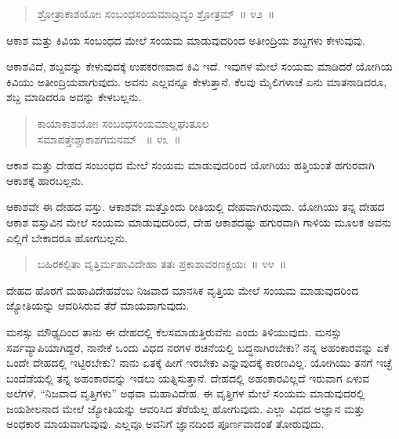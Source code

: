 \vspace{-0.3cm}

\begin{verse}
ಶ್ರೋತ್ರಾಕಾಶಯೋಃ ಸಂಬಂಧಸಂಯಮಾದ್ದಿವ್ಯಂ ಶ್ರೋತ್ರಮ್​~॥ ೪೨~॥
\end{verse}

\vspace{-0.3cm}

ಆಕಾಶ ಮತ್ತು ಕಿವಿಯ ಸಂಬಂಧದ ಮೇಲೆ ಸಂಯಮ ಮಾಡುವುದರಿಂದ ಅತೀಂದ್ರಿಯ ಶಬ್ದಗಳು ಕೇಳುವುವು. 

ಆಕಾಶವಿದೆ, ಶಬ್ದವನ್ನು ಕೇಳುವುದಕ್ಕೆ ಉಪಕರಣವಾದ ಕಿವಿ ಇದೆ. ಇವುಗಳ ಮೇಲೆ ಸಂಯಮ ಮಾಡಿದರೆ ಯೋಗಿಯ ಕಿವಿಯು ಅತೀಂದ್ರಿಯವಾಗುವುದು. ಅವನು ಎಲ್ಲವನ್ನೂ ಕೇಳುತ್ತಾನೆ. ಕೆಲವು ಮೈಲಿಗಳಾಚೆ ಏನು ಮಾತನಾಡಿದರೂ, ಶಬ್ದ ಮಾಡಿದರೂ ಅದನ್ನು ಕೇಳಬಲ್ಲನು. 

\vspace{-0.3cm}

\begin{verse}
ಕಾಯಾಕಾಶಯೋಃ ಸಂಬಂಧಸಂಯಮಾಲ್ಲಘುತೂಲ\\ ಸಮಾಪತ್ತೇಶ್ಚಾಕಾಶಗಮನಮ್​~ \hfill{॥ ೪೩~॥}
\end{verse}

\vspace{-0.3cm}

ಆಕಾಶ ಮತ್ತು ದೇಹದ ಸಂಬಂಧದ ಮೇಲೆ ಸಂಯಮ ಮಾಡುವುದರಿಂದ ಯೋಗಿಯು ಹತ್ತಿಯಂತೆ ಹಗುರವಾಗಿ ಆಕಾಶಕ್ಕೆ ಹಾರಬಲ್ಲನು. 

ಆಕಾಶವೇ ಈ ದೇಹದ ವಸ್ತು. ಆಕಾಶವೇ ಮತ್ತೊಂದು ರೀತಿಯಲ್ಲಿ ದೇಹವಾಗಿರುವುದು. ಯೋಗಿಯು ತನ್ನ ದೇಹದ ಆಕಾಶ ವಸ್ತುವಿನ ಮೇಲೆ ಸಂಯಮ ಮಾಡುವುದರಿಂದ, ದೇಹ ಆಕಾಶದಷ್ಟು ಹಗುರವಾಗಿ ಗಾಳಿಯ ಮೂಲಕ ಅವನು ಎಲ್ಲಿಗೆ ಬೇಕಾದರೂ ಹೋಗಬಲ್ಲನು. 

\vspace{-0.3cm}

\begin{verse}
ಬಹಿರಕಲ್ಪಿತಾ ವೃತ್ತಿರ್ಮಹಾವಿದೇಹಾ ತತಃ ಪ್ರಕಾಶಾವರಣಕ್ಷಯಃ~॥ ೪೪~॥
\end{verse}

\vspace{-0.3cm}

ದೇಹದ ಹೊರಗೆ ಮಹಾವಿದೇಹವೆಂಬ ನಿಜವಾದ ಮಾನಸಿಕ ವೃತ್ತಿಯ ಮೇಲೆ ಸಂಯಮ ಮಾಡುವುದರಿಂದ ಜ್ಯೋತಿಯನ್ನು ಆವರಿಸಿರುವ ತೆರೆ ಮಾಯವಾಗುವುದು. 

ಮನಸ್ಸು ಮೌಢ್ಯದಿಂದ ತಾನು ಈ ದೇಹದಲ್ಲಿ ಕೆಲಸಮಾಡುತ್ತಿರುವೆನು ಎಂದು ತಿಳಿಯುವುದು. ಮನಸ್ಸು ಸರ್ವವ್ಯಾಪಿಯಾಗಿದ್ದರೆ, ನಾನೇಕೆ ಒಂದು ವಿಧದ ನರಗಳ ರಚನೆಯಲ್ಲಿ ಬದ್ಧನಾಗಿರಬೇಕು? ನನ್ನ ಅಹಂಕಾರವನ್ನು ಏಕೆ ಒಂದೇ ದೇಹದಲ್ಲಿ ಇಟ್ಟಿರಬೇಕು? ನಾನು ಏತಕ್ಕೆ ಹೀಗೆ ಇರಬೇಕು ಎನ್ನುವುದಕ್ಕೆ ಕಾರಣವಿಲ್ಲ. ಯೋಗಿಯು ತನಗೆ ಇಚ್ಛೆ ಬಂದೆಡೆಯಲ್ಲಿ ತನ್ನ ಅಹಂಕಾರವನ್ನು ಇಡಲು ಯತ್ನಿಸುತ್ತಾನೆ. ದೇಹದಲ್ಲಿ ಅಹಂಕಾರವಿಲ್ಲದೆ ಇರುವಾಗ ಏಳುವ ಅಲೆಗಳೆ, “ನಿಜವಾದ ವೃತ್ತಿಗಳು” ಅಥವಾ ಮಹಾವಿದೇಹ. ಈ ವೃತ್ತಿಗಳ ಮೇಲೆ ಸಂಯಮ ಮಾಡುವುದರಲ್ಲಿ ಜಯಶೀಲನಾದ ಮೇಲೆ ಜ್ಯೋತಿಯನ್ನು ಆವರಿಸಿದ ತೆರೆಯೆಲ್ಲ ಹೋಗುವುದು. ಎಲ್ಲಾ ವಿಧದ ಅಜ್ಞಾನ ಮತ್ತು ಅಂಧಕಾರ ಮಾಯವಾಗುವುವು. ಎಲ್ಲವೂ ಅವನಿಗೆ ಜ್ಞಾನದಿಂದ ಪೂರ್ಣವಾದಂತೆ ತೋರುವುದು. 

